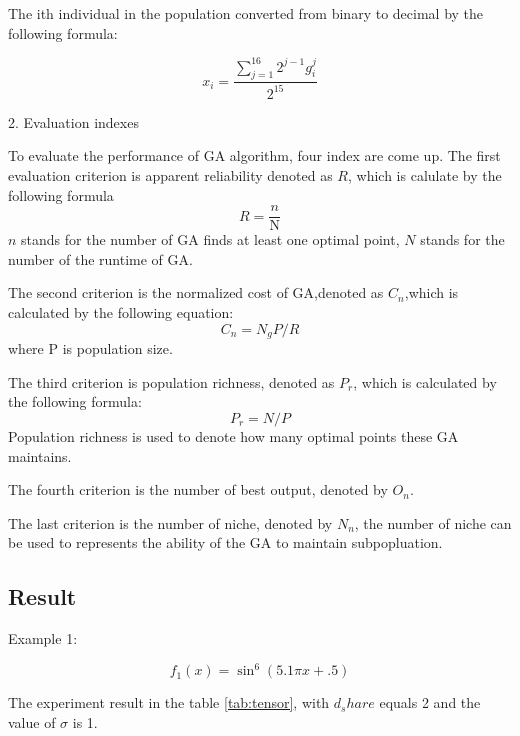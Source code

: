 \documentclass[smallextended]{svjour3}       %
\begin{document}
\begin{multicols}{2}
The ith individual in the population converted  from binary to decimal by the following formula:

\begin{equation}
x_i=\frac{\sum_{j=1}^{16}2^{j-1}g_i^j}{2^{15}}
\end{equation}


2. Evaluation indexes

To evaluate the performance of GA algorithm, four index are come up. The first evaluation criterion
is apparent reliability denoted as $R$, which is calulate by the following formula
\begin{equation}
R = \frac{n}{\text{N}}
\end{equation}
$n$ stands for the number of GA finds at least one optimal point, $N$ stands for the number of the 
runtime of GA.

The second criterion is the normalized cost of GA,denoted as $C_n$,which is calculated by the following
equation:
\begin{equation}
C_{n} = N_{g}P/R
\end{equation}
where P is population size. 

The third criterion is population richness, denoted as $P_{r}$, which is calculated by the following
formula:
$$
P_{r} = N/P
$$
Population richness is used to denote how many optimal points these GA maintains.

The fourth criterion is the number of best output, denoted by $O_{n}$.

The last criterion is the number of niche, denoted by $N_{n}$, the number of niche can be used to 
represents the ability of the GA to maintain subpopluation.


\subsection{Result}
Example 1:

\begin{equation}
f_{1}(x)=\sin^{6}(5.1 \pi x+.5)
\end{equation}

The experiment result in the table \ref{tab:tensor}, with $d_share$ equals 2 and the value of $\sigma$ 
is 1.


\end{multicols}
\end{document}
